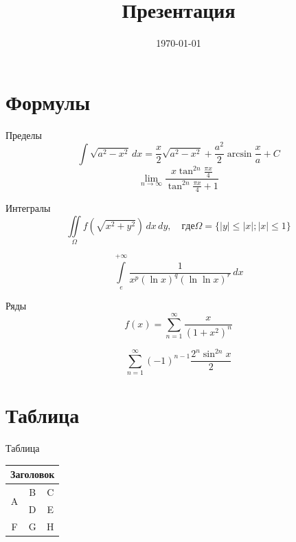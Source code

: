 \documentclass[12pt]{beamer}
\title{Презентация}
\date{\today}
\begin{document}
\begin{frame}
\titlepage
\end{frame}

\section{Формулы}
\begin{frame}{Пределы}
\begin{equation}
\int \sqrt{a^2-x^2} \, dx = \frac{x}{2}\sqrt{a^2-x^2}+ \frac{a^2}{2}\arcsin \frac{x}{a} +C
\end{equation}
\begin{equation}
\lim_{n \to \infty} \frac{ x\tan^{2n}\frac{\pi x}{4}}{\tan^{2n}\frac{\pi x}{4} + 1}
\end{equation}
\end{frame}

\begin{frame}{Интегралы}
\begin{equation}
\iint\limits_{\Omega} f(\sqrt{x^2+y^2}) \,dx\,dy , \quad где \Omega =\{|y| \le |x| ; |x| \le 1\}
\end{equation}

\begin{equation}
\int\limits_{e}^{+\infty} \dfrac{1}{x^p \left(\ln x\right)^q \left(\ln\ln x\right)^r} \,dx
\end{equation}
\end{frame}

\begin{frame}{Ряды}
\begin{equation}
f(x)=\sum\limits_{n=1}^{\infty} \dfrac{x}{(1+x^2)^n}
\end{equation}

\begin{equation}
\sum\limits_{n=1}^{\infty} \left(-1\right)^{n-1} \frac{2^n \sin^{2n} x}{2}
\end{equation}
\end{frame}

\section{Таблица}
\begin{frame}{Таблица}
\begin{table}[h]
\centering
\begin{tabular}{|c|c|c|}
\hline
\multicolumn{3}{|c|}{Заголовок} \\
\hline
\multirow{2}{*}{A} & B & C \\
\cline{2-3}
& D & E \\
\hline
F & G & H \\
\hline
\end{tabular}
\end{table}
\end{frame}
\end{document}
